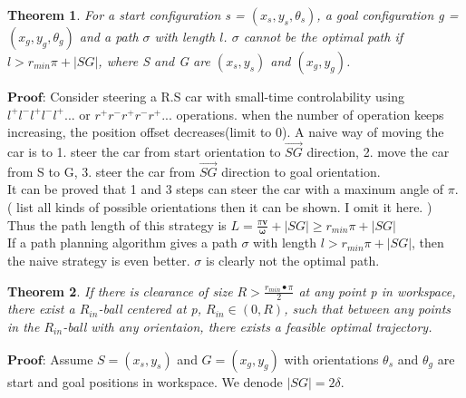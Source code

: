 \documentclass[12pt]{article}
\newtheorem{theorem}{Theorem}[section]
\begin{document}
  \begin{theorem}
  	For a start configuration s = $(x_{s},y_{s},\theta_{s})$, a goal configuration g = $(x_{g},y_{g},\theta_{g})$ and a path $\sigma$ with length $l$. $\sigma$ cannot be the optimal path if $l > r_{min}\pi + |SG|$, where S and G are $(x_{s}, y_{s})$ and $(x_{g}, y_{g})$.
  \end{theorem} 
  
  $\textbf{Proof}$: Consider steering a R.S car with small-time controlability using $l^{+}l^{-}l^{+}l^{-}l^{+}...$ or $r^{+}r^{-}r^{+}r^{-}r^{+}...$ operations. when the number of operation keeps increasing, the position offset decreases(limit to 0). A naive way of moving the car is to 1. steer the car from start orientation to $\vec{SG}$ direction, 2. move the car from S to G, 3. steer the car from $\vec{SG}$ direction to goal orientation.\\
  
  It can be proved that 1 and 3 steps can steer the car with a maxinum angle of $\pi$. ( list all kinds of possible orientations then it can be shown. I omit it here. )\\
  
  Thus the path length of this strategy is $L = \frac{\pi\boldsymbol{v}}{\boldsymbol{\omega}} + |SG| \geq r_{min}\pi + |SG|$\\
  
  If a path planning algorithm gives a path $\sigma$ with length $ l > r_{min}\pi + |SG|$, then the naive strategy is even better. $\sigma$ is clearly not the optimal path.\\
   
  \begin{theorem}
  	If there is clearance of size $R > \frac{r_{min}•\pi}{2}$ at any point p in workspace, there exist a $R_{in}$-ball centered at p, $R_{in} \in (0, R)$, such that between any points in the $R_{in}$-ball with any orientaion, there exists a feasible optimal trajectory.
  \end{theorem} 
  
  $\textbf{Proof}$: Assume $S = (x_{s}, y_{s})$ and $G = (x_{g}, y_{g})$ with orientations $\theta_{s}$ and $\theta_{g}$ are start and goal positions in workspace. We denode $|SG| = 2\delta$. \\
  
\end{document}
